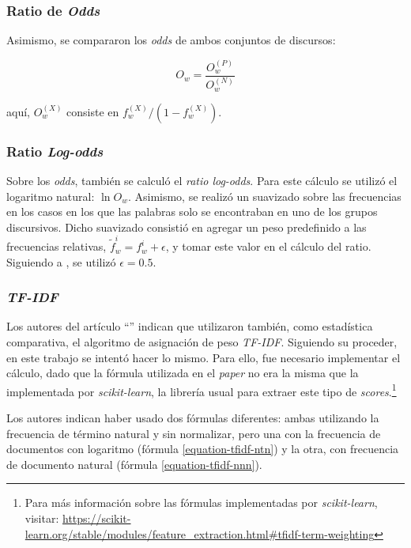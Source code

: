 \subsubsection{Ratio de \textit{Odds}}
Asimismo, se compararon los \textit{odds} de ambos conjuntos de discursos:

\begin{equation}
    O_w = \frac{O_{w}^{(P)}}{O_{w}^{(N)}}
\end{equation}

aqu\'i, $O_{w}^{(X)}$ consiste en $f_{w}^{(X)}/(1-f_{w}^{(X)})$.

\subsubsection{Ratio \textit{Log-odds}}
Sobre los \textit{odds}, tambi\'en se calcul\'o el \textit{ratio log-odds}.
Para este c\'alculo se utiliz\'o el logaritmo natural: $\ln{O_w}$.
Asimismo, se realizó un suavizado sobre las frecuencias en los casos
en los que las palabras solo se encontraban en uno de los grupos
discursivos. Dicho suavizado consistió en agregar un peso predefinido a las
frecuencias relativas, $\tilde{f}^{i}_{w} = f^{i}_{w}+\epsilon$, y tomar
este valor en el cálculo del ratio. Siguiendo a \cite{monroe2008fightin},
se utilizó $\epsilon=0.5$.

\subsubsection{\textit{TF-IDF}}
\label{subsubsec-methods-tfidf}
Los autores del art\'iculo ``'' indican
que utilizaron tambi\'en, como estad\'istica comparativa, el algoritmo de asignaci\'on
de peso \textit{TF-IDF}. Siguiendo su proceder, en este trabajo se intent\'o
hacer lo mismo. Para ello, fue necesario implementar el c\'alculo, dado que
la f\'ormula utilizada en el \textit{paper} no era la misma que la implementada
por \textit{scikit-learn}, la librer\'ia usual para extraer
este tipo de \textit{scores}.\footnote{Para m\'as informaci\'on sobre las f\'ormulas
implementadas por \textit{scikit-learn}, visitar:
\url{https://scikit-learn.org/stable/modules/feature_extraction.html\#tfidf-term-weighting}}\par
Los autores indican haber usado dos fórmulas diferentes: ambas utilizando la frecuencia
de término natural y sin normalizar, pero una con la frecuencia de documentos
con logaritmo (fórmula \ref{equation-tfidf-ntn}) y la otra, con frecuencia de documento
natural (fórmula \ref{equation-tfidf-nnn}).

